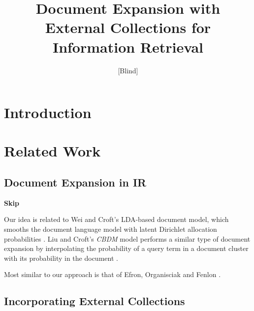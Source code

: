 \documentclass{report}
\begin{document}
\author{[Blind]}

\title{Document Expansion with External Collections for Information Retrieval}

\maketitle
\begin{abstract}
\end{abstract}



\section{Introduction}\label{section.intro}

\section{Related Work}\label{section.related}

\subsection{Document Expansion in IR}\label{section.related.ir}

\textbf{Skip}

Our idea is related to Wei and Croft's LDA-based document model, which smooths the document language model with latent Dirichlet allocation probabilities \cite{Wei2006}. Liu and Croft's \textit{CBDM} model performs a similar type of document expansion by interpolating the probability of a query term in a document cluster with its probability in the document \cite{Liu2004}.

Most similar to our approach is that of Efron, Organisciak and Fenlon \cite{Efron2012}.

\subsection{Incorporating External Collections}\label{section.external.collections}
\end{document}
